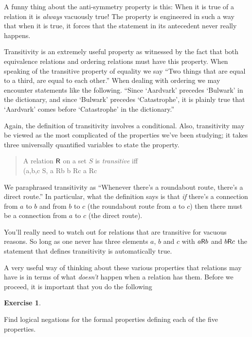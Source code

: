 \documentclass[10pt,]{book}
\theoremstyle{plain}
\theoremstyle{definition}
\theoremstyle{definition}
\newtheorem{exercise}[theorem]{Exercise}
\numberwithin{equation}{section}
\newcommand{\relR}{\mbox{\textsf R}}
\begin{document}
    A funny thing about the anti-symmetry property is this: When it is true of a relation it
    is \emph{always} vacuously true! The property is engineered in such a way that when it is
    true, it forces that the statement in its antecedent never really happens.
\par

    Transitivity is an extremely useful property as witnessed by the fact that both equivalence
    relations and ordering relations must have this property. When speaking of the transitive
    property of equality we say ``Two things that are equal to a third, are equal to each other.''
    When dealing with ordering we may encounter statements like the following.
    ``Since `Aardvark' precedes `Bulwark'
    in the dictionary, and since `Bulwark' precedes `Catastrophe', it is plainly true that `Aardvark'
    comes before `Catastrophe' in the dictionary.''
\par

    Again, the definition of transitivity involves a conditional. Also, transitivity may be viewed
    as the most complicated of the properties we've been studying; it takes three universally
    quantified variables to state the property.
\begin{quote}
  A relation \(\relR\) on a set \(S\) is \emph{transitive} iff 
  \\(\displaystyle \forall a,b,c \in S,  a \relR b \; \land \; b \relR c  \implies  a \relR c\)\end{quote}
\par

    We paraphrased transitivity as ``Whenever there's a roundabout route, there's a direct route.''
    In particular, what the definition says is that \emph{if} there's a connection from \(a\) to \(b\) and from
    \(b\) to \(c\) (the roundabout route from \(a\) to \(c\)) then there must be a connection from \(a\) to \(c\) (the direct
    route).
\par

    You'll really need to watch out for relations that are transitive for vacuous reasons. So long as one
    never has three elements \(a\), \(b\) and \(c\) with \(a \relR b\) and \(b \relR c\) the statement that defines
    transitivity is automatically true.
\par

    A very useful way of thinking about these various properties that relations may have is in terms of
    what \emph{doesn't} happen when a relation has them. Before we proceed, it is important that
    you do the following
\begin{exercise}\label{exercise-50}

        Find logical negations for the formal properties defining each of the five
        properties.
\end{exercise}
\par
\end{document}
